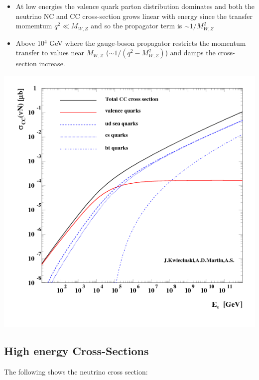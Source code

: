 \documentclass[
  letterpaper,
  DIV=11,
  numbers=noendperiod]{scrreprt}
\begin{document}
\begin{itemize}
\item
  At low energies the valence quark parton distribution dominates and
  both the neutrino NC and CC cross-section grows linear with energy
  since the transfer momemtum \(q^2 \ll M_{W,Z}\) and so the propagator
  term is \(\sim 1/M^2_{W,Z}\)
\item
  Above 10\(^{4}\) GeV where the gauge-boson propagator restricts the
  momentum transfer to values near \(M_{W,Z}\)
  (\(\sim 1/(q^2 - M^2_{W,Z})\)) and damps the cross-section increase.
\end{itemize}

\includegraphics{images/break_cc_new.png}

\subsection*{High energy
Cross-Sections}\label{high-energy-cross-sections}

The following shows the neutrino cross section:
\end{document}
